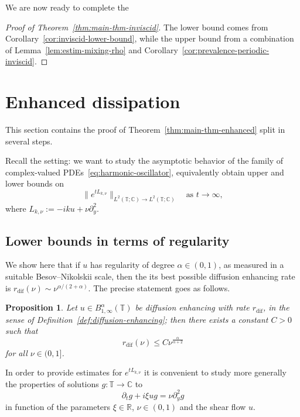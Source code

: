 \documentclass[11pt,oneside,reqno]{amsart}
\newcommand{\assign}{:=}
\newtheorem{proposition}[theorem]{Proposition}
{\theoremstyle{remark}\newtheorem{remark}[theorem]{Remark}}
\numberwithin{equation}{section}
\begin{document}
We are now ready to complete the

\begin{proof}[Proof of Theorem~\ref{thm:main-thm-inviscid}]
  The lower bound comes from Corollary~\ref{cor:inviscid-lower-bound}, while
  the upper bound from a combination of Lemma~\ref{lem:estim-mixing-rho} and
  Corollary~\ref{cor:prevalence-periodic-inviscid}.
\end{proof}

\section{Enhanced dissipation}\label{sec:enhanced-dissipation}

This section contains the proof of Theorem~\ref{thm:main-thm-enhanced} split
in several steps.

Recall the setting: we want to study the asymptotic behavior of the family of
complex-valued PDEs~\eqref{eq:harmonic-oscillator}, equivalently obtain upper
and lower bounds on
\[ \| e^{t L_{k, \nu}} \|_{L^2 (\mathbb{T}; \mathbb{C}) \rightarrow L^2
   (\mathbb{T}; \mathbb{C})} \quad \text{as } t \rightarrow \infty, \]
where $L_{k, \nu} \assign - i k u + \nu \partial_y^2 .$

\subsection{Lower bounds in terms of
regularity}\label{sec:lower-bound-enhanced}

We show here that if $u$ has regularity of degree $\alpha \in (0, 1)$, as
measured in a suitable Besov--Nikolskii scale, then the its best possible
diffusion enhancing rate is $r_{\text{dif}}(\nu) \sim
\nu^{\alpha / (2 + \alpha)}$. The precise statement goes as follows.

\begin{proposition}
  \label{prop:lower-bound-enhanced}Let $u \in B^{\alpha}_{1, \infty}
  (\mathbb{T})$ be diffusion enhancing with rate
  $r_{\text{dif}}$, in the sense of
  Definition~\ref{def:diffusion-enhancing}; then there exists a constant $C >
  0$ such that
  \[ r_{\text{dif}} (\nu) \leqslant C \nu^{\frac{\alpha}{\alpha
     + 2}} \]
  for all $\nu \in (0, 1]$.
\end{proposition}

In order to provide estimates for $e^{t L_{k, \nu}}$ it is convenient to study
more generally the properties of solutions $g : \mathbb{T} \rightarrow
\mathbb{C}$ to
\begin{equation}
  \partial_t g + i \xi u g = \nu \partial_y^2 g \label{eq:complex-PDE}
\end{equation}
in function of the parameters $\xi \in \mathbb{R}$, $\nu \in (0, 1)$ and the
shear flow $u$.
\end{document}
